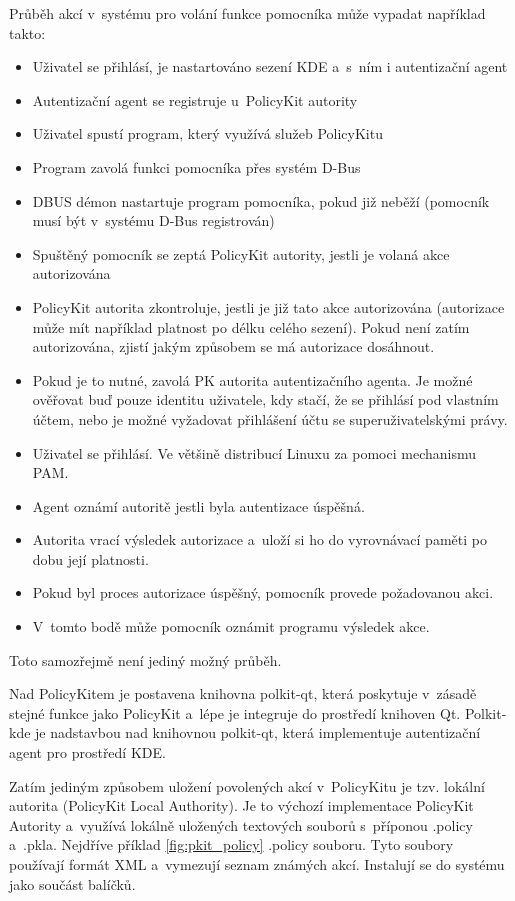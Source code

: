 Průběh akcí v~systému pro volání funkce pomocníka může vypadat například takto:
\begin{itemize}
\item Uživatel se přihlásí, je nastartováno sezení KDE a~s~ním i autentizační agent
\item Autentizační agent se registruje u~PolicyKit autority
\item Uživatel spustí program, který využívá služeb PolicyKitu
\item Program zavolá funkci pomocníka přes systém D-Bus
\item DBUS démon nastartuje program pomocníka, pokud již neběží (pomocník musí být v~systému D-Bus registrován)
\item Spuštěný pomocník se zeptá PolicyKit autority, jestli je volaná akce autorizována
\item PolicyKit autorita zkontroluje, jestli je již tato akce autorizována (autorizace může mít například platnost po délku celého sezení). Pokud není zatím autorizována, zjistí jakým způsobem se má autorizace dosáhnout.
\item Pokud je to nutné, zavolá PK autorita autentizačního agenta. Je možné ověřovat buď pouze identitu uživatele, kdy stačí, že se přihlásí pod vlastním účtem, nebo je možné vyžadovat přihlášení účtu se superuživatelskými právy.
\item Uživatel se přihlásí. Ve většině distribucí Linuxu za pomoci mechanismu PAM.
\item Agent oznámí autoritě jestli byla autentizace úspěšná.
\item Autorita vrací výsledek autorizace a~uloží si ho do vyrovnávací paměti po dobu její platnosti.
\item Pokud byl proces autorizace úspěšný, pomocník provede požadovanou akci.
\item V~tomto bodě může pomocník oznámit programu výsledek akce.
\end{itemize}

Toto samozřejmě není jediný možný průběh.

Nad PolicyKitem je postavena knihovna polkit-qt, která poskytuje v~zásadě stejné funkce jako PolicyKit a~lépe je integruje do prostředí knihoven Qt. Polkit-kde je nadstavbou nad knihovnou polkit-qt, která implementuje autentizační agent pro prostředí KDE.

Zatím jediným způsobem uložení povolených akcí v~PolicyKitu je tzv. lokální autorita (PolicyKit Local Authority). Je to výchozí implementace PolicyKit Autority a~využívá lokálně uložených textových souborů s~příponou .policy a~.pkla. Nejdříve příklad \ref{fig:pkit_policy} .policy souboru. Tyto soubory používají formát XML a~vymezují seznam známých akcí. Instalují se do systému jako součást balíčků.

